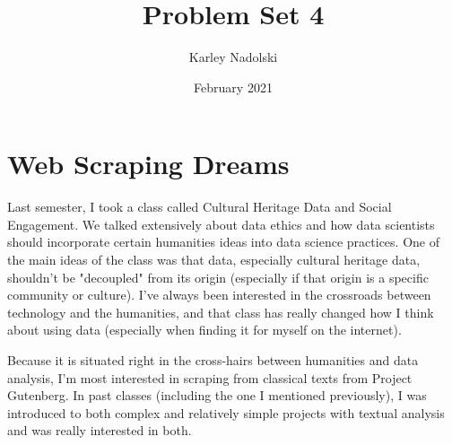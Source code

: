 \documentclass{article}
\title{Problem Set 4}
\author{Karley Nadolski}
\date{February 2021}
\begin{document}
\maketitle

\section{Web Scraping Dreams}
Last semester, I took a class called Cultural Heritage Data and Social Engagement. We talked extensively about data ethics and how data scientists should incorporate certain humanities ideas into data science practices. One of the main ideas of the class was that data, especially cultural heritage data, shouldn't be "decoupled" from its origin (especially if that origin is a specific community or culture). I've always been interested in the crossroads between technology and the humanities, and that class has really changed how I think about using data (especially when finding it for myself on the internet). 

 Because it is situated right in the cross-hairs between humanities and data analysis, I'm most interested in scraping from classical texts from Project Gutenberg. In past classes (including the one I mentioned previously), I was introduced to both complex and relatively simple projects with textual analysis and was really interested in both.  
\end{document}

